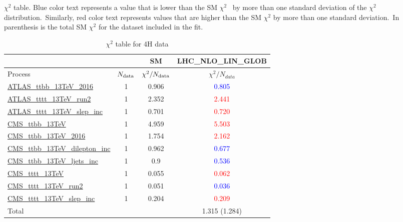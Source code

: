 \documentclass{article}
\begin{document}
$\chi^2$ table. Blue color text represents a value that is lower than the SM $\chi^2$ \
            by more than one standard deviation of the $\chi^2$ distribution.\
            Similarly, red color text represents values that are higher than the SM $\chi^2$ by more than one standard deviation.\
            In parenthesis is the total SM $\chi^2$ for the dataset included in the fit. \\
\begin{table}[H]
\centering
\begin{tabular}{|l|c|c|c|}
\hline
 \multicolumn{2}{|c|}{} & SM& LHC_NLO_LIN_GLOB\\ \hline
Process & $N_{\rm data}$ & $\chi^ 2/N_{\rm data}$& $\chi^ 2/N_{data}$\\ \hline
\href{https://arxiv.org}{ATLAS_ttbb_13TeV_2016} & 1 & 0.906 & \textcolor{blue}                            {0.805} \\ \hline
\href{https://arxiv.org}{ATLAS_tttt_13TeV_run2} & 1 & 2.352 & \textcolor{red}                            {2.441} \\ \hline
\href{https://arxiv.org}{ATLAS_tttt_13TeV_slep_inc} & 1 & 0.701 & \textcolor{red}                            {0.720} \\ \hline
\href{https://arxiv.org}{CMS_ttbb_13TeV} & 1 & 4.959 & \textcolor{red}                            {5.503} \\ \hline
\href{https://arxiv.org}{CMS_ttbb_13TeV_2016} & 1 & 1.754 & \textcolor{red}                            {2.162} \\ \hline
\href{https://arxiv.org}{CMS_ttbb_13TeV_dilepton_inc} & 1 & 0.962 & \textcolor{blue}                            {0.677} \\ \hline
\href{https://arxiv.org}{CMS_ttbb_13TeV_ljets_inc} & 1 & 0.9 & \textcolor{blue}                            {0.536} \\ \hline
\href{https://arxiv.org}{CMS_tttt_13TeV} & 1 & 0.055 & \textcolor{red}                            {0.062} \\ \hline
\href{https://arxiv.org}{CMS_tttt_13TeV_run2} & 1 & 0.051 & \textcolor{blue}                            {0.036} \\ \hline
\href{https://arxiv.org}{CMS_tttt_13TeV_slep_inc} & 1 & 0.204 & \textcolor{red}                            {0.209} \\ \hline
\hline Total & &  & 1.315 (1.284) \\ \hline
\end{tabular}
\caption{$\chi^2$ table for 4H data}
\end{table}
\end{document}
